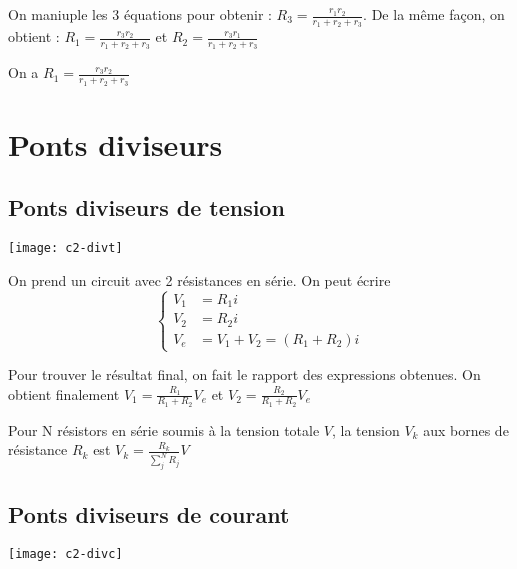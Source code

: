 \documentclass[french]{yLectureNote}
\begin{document}
On maniuple les 3 équations pour %
obtenir : $R_3 = \frac{r_1r_2}{r_1+r_2+r_3}$. De la m\^eme façon, on obtient : $R_1 = \frac{r_3r_2}{r_1+r_2+r_3}$ et $R_2 = \frac{r_3r_1}{r_1+r_2+r_3}$
\begin{theorem}
 On a \(R_1 = \frac{r_3r_2}{r_1+r_2+r_3}\)
\end{theorem}

\section{Ponts diviseurs}

\subsection{Ponts diviseurs de tension}
\texttt{[image: c2-divt]}

On prend un circuit avec 2 résistances en série. On peut écrire \[ \left\{\begin{matrix}
 V_1 &= R_1i\\
 V_2 &= R_2i\\
 V_e &= V_1+V_2 = (R_1+R_2)i
\end{matrix}\right.\]

Pour trouver le résultat final, on fait le rapport des expressions obtenues. On obtient finalement $\displaystyle V_1 = \frac{R_1}{R_1+R_2}V_e$ et $\displaystyle V_2 = \frac{R_2}{R_1+R_2}V_e$

\begin{theorem}
Pour N résistors en
série soumis à la tension totale $V$, la tension $V_k$ aux bornes de résistance $R_k$
est \(V_k = \frac{R_k}{\sum_j^N R_j}V\)
\end{theorem}
\subsection{Ponts diviseurs de courant}
\texttt{[image: c2-divc]}
%
%
\end{document}
